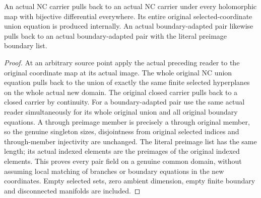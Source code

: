 \begin{lemma}
\label{hir:general-nc-whole-biholomorphic-carrier-pair}
\leanok
{}
An actual NC carrier pulls back to an actual NC carrier under every
holomorphic map with bijective differential everywhere. Its entire
original selected-coordinate union equation is produced internally.
An actual boundary-adapted pair likewise pulls back to an actual
boundary-adapted pair with the literal preimage boundary list.
\end{lemma}
\begin{proof}
At an arbitrary source point apply the actual preceding reader to the
original coordinate map at its actual image. The whole original NC
union equation pulls back to the union of exactly the same finite
selected hyperplanes on the whole actual new domain. The original
closed carrier pulls back to a closed carrier by continuity. For a
boundary-adapted pair use the same actual reader simultaneously for
its whole original union and all original boundary equations. A
through preimage member is precisely a through original member, so
the genuine singleton sizes, disjointness from original selected
indices and through-member injectivity are unchanged. The literal
preimage list has the same length; its actual indexed elements are
the preimages of the original indexed elements. This proves every
pair field on a genuine common domain, without assuming local
matching of branches or boundary equations in the new coordinates.
Empty selected sets, zero ambient dimension, empty finite boundary
and disconnected manifolds are included.
\end{proof}

